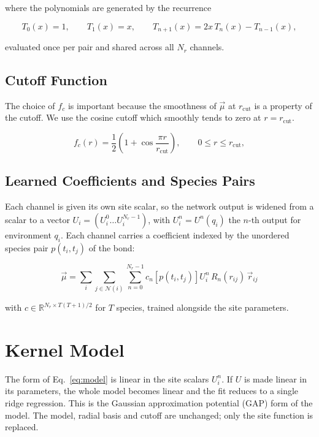 \documentclass[11pt,a4paper]{article}
\begin{document}
where the polynomials are generated by the recurrence

\begin{equation}
    T_0(x) = 1,
    \qquad T_1(x) = x,
    \qquad T_{n+1}(x) = 2x\,T_n(x) - T_{n-1}(x),
    \label{eq:cheb-rec}
\end{equation}

evaluated once per pair and shared across all $N_r$ channels.

\subsection{Cutoff Function}

The choice of $f_c$ is important because the
smoothness of $\vec{\mu}$ at $r_{\mathrm{cut}}$ is a property of the cutoff. We
use the cosine cutoff which smoothly tends to zero at $r = r_{\mathrm{cut}}$.

\begin{equation}
    f_c(r) = \frac{1}{2}\left(1 + \cos \frac{\pi r}{r_{\mathrm{cut}}}\right),
    \qquad 0 \le r \le r_{\mathrm{cut}},
    \label{eq:fc}
\end{equation}

\subsection{Learned Coefficients and Species Pairs}

Each channel is given its own site scalar, so the network output is widened
from a scalar to a vector $U_i = (U_i^0 \ldots U_i^{N_r-1})$, with
$U_i^n = U^n(q_i)$ the $n$-th output for environment $q_i$. Each channel
carries a coefficient indexed by the unordered species pair $p(t_i, t_j)$ of
the bond:

\begin{equation}
    \vec{\mu} = \sum_i \sum_{j \in \mathcal{N}(i)} \sum_{n=0}^{N_r-1}
        c_n\!\left[p(t_i, t_j)\right] U_i^n\, R_n(r_{ij})\, \vec{r}_{ij}
    \label{eq:model}
\end{equation}

with $c \in \mathbb{R}^{N_r \times T(T+1)/2}$ for $T$ species, trained alongside the site parameters.

\section{Kernel Model}

The form of Eq.~\ref{eq:model} is linear in the site scalars $U_i^n$. If $U$ is
made linear in its parameters, the whole model becomes linear and the fit
reduces to a single ridge regression. This is the Gaussian approximation
potential (GAP) form of the model. The model, radial basis and cutoff are
unchanged; only the site function is replaced.
\end{document}
